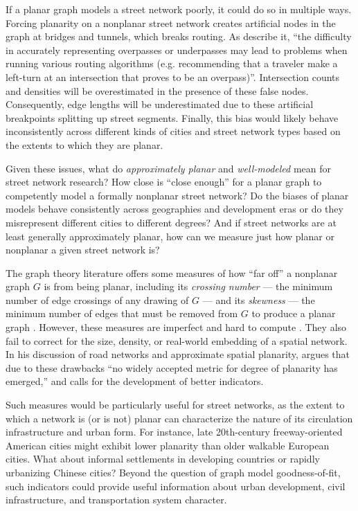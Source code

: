 \documentclass[Afour,sageh,times]{sagej}
\begin{document}
If a planar graph models a street network poorly, it could do so in multiple ways. Forcing planarity on a nonplanar street network creates artificial nodes in the graph at bridges and tunnels, which breaks routing. As \citet[p.~6]{kwan_review_1996} describe it, \enquote{the difficulty in accurately representing overpasses or underpasses may lead to problems when running various routing algorithms (e.g. recommending that a traveler make a left-turn at an intersection that proves to be an overpass)}. Intersection counts and densities will be overestimated in the presence of these false nodes. Consequently, edge lengths will be underestimated due to these artificial breakpoints splitting up street segments. Finally, this bias would likely behave inconsistently across different kinds of cities and street network types based on the extents to which they are planar.

Given these issues, what do \emph{approximately planar} and \emph{well-modeled} mean for street network research? How close is \enquote{close enough} for a planar graph to competently model a formally nonplanar street network? Do the biases of planar models behave consistently across geographies and development eras or do they misrepresent different cities to different degrees? And if street networks are at least generally approximately planar, how can we measure just how planar or nonplanar a given street network is?

The graph theory literature offers some measures of how \enquote{far off} a nonplanar graph $G$ is from being planar, including its \emph{crossing number} --- the minimum number of edge crossings of any drawing of $G$ --- and its \emph{skewness} --- the minimum number of edges that must be removed from $G$ to produce a planar graph \citep{liebers_planarizing_2001,chimani_non-planar_2009}. However, these measures are imperfect and hard to compute \citep{szekely_successful_2004,chimani_vertex_2012}. They also fail to correct for the size, density, or real-world embedding of a spatial network. In his discussion of road networks and approximate spatial planarity, \citet[p.~133]{newman_networks:_2010} argues that due to these drawbacks \enquote{no widely accepted metric for degree of planarity has emerged,} and calls for the development of better indicators.

Such measures would be particularly useful for street networks, as the extent to which a network is (or is not) planar can characterize the nature of its circulation infrastructure and urban form. For instance, late 20th-century freeway-oriented American cities might exhibit lower planarity than older walkable European cities. What about informal settlements in developing countries or rapidly urbanizing Chinese cities? Beyond the question of graph model goodness-of-fit, such indicators could provide useful information about urban development, civil infrastructure, and transportation system character.
\end{document}
